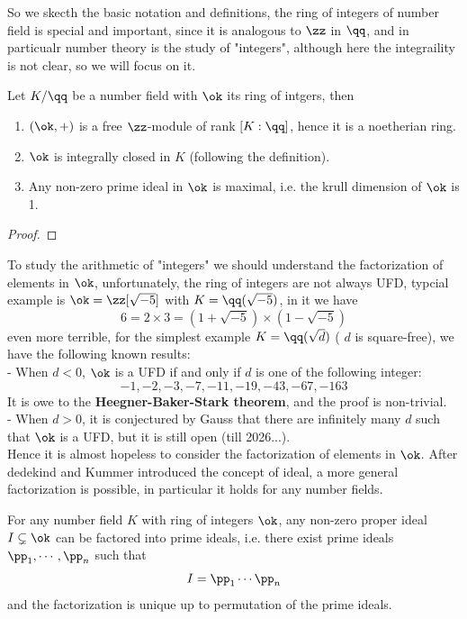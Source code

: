 So we skecth the basic notation and definitions, the ring of integers of number field is special and important, since it is analogous to \(\zz\) in \(\qq\), and in particualr number theory is the study of "integers", although here the integraility is not clear, so we will focus on it.

\begin{colortheorem}
    Let \(K/ \qq\) be a number field with \(\ok\) its ring of intgers, then
    \begin{enumerate}
        \item \((\ok,+)\) is a free \(\zz\)-module of rank \([K:\qq]\), hence it is a noetherian ring.
        \item \(\ok\) is integrally closed in \(K\) (following the definition).
        \item Any non-zero prime ideal in \(\ok\) is maximal, i.e. the krull dimension of \(\ok\) is 1.
    \end{enumerate}
\end{colortheorem}
\begin{proof}

\end{proof}

To study the arithmetic of "integers" we should understand the factorization of elements in \(\ok\), unfortunately, the ring of integers are not always UFD, typcial example is \(\ok = \zz[\sqrt{-5}]\) with \(K = \qq(\sqrt{-5})\), in it we have
\[6 = 2 \times 3 = (1 + \sqrt{-5})\times (1 - \sqrt{-5})\]
even more terrible, for the simplest example \(K=\qq(\sqrt{d})\) ( \(d\) is square-free), we have the following known results:\\

- When \(d<0\), \(\ok\) is a UFD if and only if \(d\) is one of the following integer:
\[-1,-2,-3,-7,-11,-19,-43,-67,-163\]
It is owe to the \textbf{Heegner-Baker-Stark theorem}, and the proof is non-trivial.\\

- When \(d>0\), it is conjectured by Gauss that there are infinitely many \(d\) such that \(\ok\) is a UFD, but it is still open (till 2026...).\\

Hence it is almost hopeless to consider the factorization of elements in \(\ok\). After dedekind and Kummer introduced the concept of ideal, a more general factorization is possible, in particular it holds for any number fields.

\begin{colortheorem} \label{fract}
    For any number field \(K\) with ring of integers \(\ok\), any non-zero proper ideal \(I \subsetneq \ok\) can be factored into prime ideals, i.e. there exist prime ideals \(\pp_1,\cdots,\pp_n\) such that
    \[I = \pp_1 \cdots \pp_n\]
and the factorization is unique up to permutation of the prime ideals.
\end{colortheorem}

